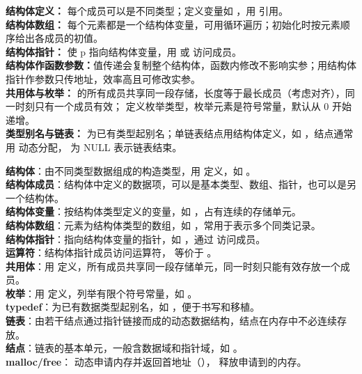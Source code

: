 \documentclass[a4paper,11pt]{article}
\begin{document}

\begin{knowmap}
\textbf{结构体定义：} 每个成员可以是不同类型；定义变量如 ，用  引用。\\[2pt]
\textbf{结构体数组：} 每个元素都是一个结构体变量，可用循环遍历；初始化时按元素顺序给出各成员的初值。\\[2pt]
\textbf{结构体指针：} 使 p 指向结构体变量，用  或  访问成员。\\[2pt]
\textbf{结构体作函数参数：}值传递会复制整个结构体，函数内修改不影响实参；用结构体指针作参数只传地址，效率高且可修改实参。\\[2pt]
\textbf{共用体与枚举：} 的所有成员共享同一段存储，长度等于最长成员（考虑对齐），同一时刻只有一个成员有效； 定义枚举类型，枚举元素是符号常量，默认从 0 开始递增。\\[2pt]
\textbf{类型别名与链表：} 为已有类型起别名；单链表结点用结构体定义，如 ，结点通常用  动态分配， 为 NULL 表示链表结束。
\end{knowmap}

\begin{keyterms}
\textbf{结构体}：由不同类型数据组成的构造类型，用  定义，如 。\\
\textbf{结构体成员}：结构体中定义的数据项，可以是基本类型、数组、指针，也可以是另一个结构体。\\
\textbf{结构体变量}：按结构体类型定义的变量，如 ，占有连续的存储单元。\\
\textbf{结构体数组}：元素为结构体类型的数组，如 ，常用于表示多个同类记录。\\
\textbf{结构体指针}：指向结构体变量的指针，如 ，通过 \code{->} 访问成员。\\
\textbf{\code{->} 运算符}：结构体指针成员访问运算符， 等价于 。\\
\textbf{共用体}：用  定义，所有成员共享同一段存储单元，同一时刻只能有效存放一个成员。\\
\textbf{枚举}：用  定义，列举有限个符号常量，如 。\\
\textbf{typedef}：为已有数据类型起别名，如 ，便于书写和移植。\\
\textbf{链表}：由若干结点通过指针链接而成的动态数据结构，结点在内存中不必连续存放。\\
\textbf{结点}：链表的基本单元，一般含数据域和指针域，如 。\\
\textbf{malloc/free}： 动态申请内存并返回首地址（）， 释放申请到的内存。
\end{keyterms}
\end{document}
